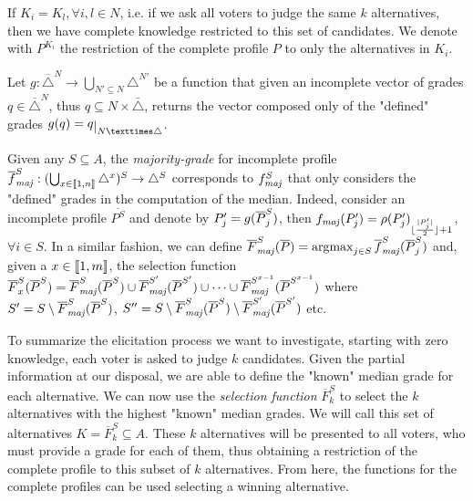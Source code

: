 If $K_i=K_l, \forall i,l\in N$, i.e. if we ask all voters to judge the same $k$ alternatives, then we have complete knowledge restricted to this set of candidates. We denote with $P^{K_i}$ the restriction of the complete profile $P$ to only the alternatives in $K_i$.

Let $g:\overline{\triangle}^N\rightarrow \bigcup_{N' \subseteq N}\triangle^{N'}$ be a function that given an incomplete vector of grades $q \in \overline{\triangle}^N$, thus $q \subseteq N × \bar{\triangle}$, returns the vector composed only of the "defined" grades $g(q) = \restr{q}{N × \triangle}$.


Given any $S \subseteq A$, the \emph{majority-grade} for incomplete profile $\fmajbar[S]: (\bigcup_{x \in \intvl{1,n}}\triangle^{x})^S \rightarrow \triangle^S$ corresponds to $\fmaj[S]$ that only considers the "defined" grades in the computation of the median. Indeed, consider an incomplete profile $\overline{P^S}$ and denote by $P'_j=g(\overline{P}^S_j)$, then $\fmaj(P'_j) = \rho(P'_j)_{\floor{\frac{\card{P'_j}}{2}} + 1}$, $\forall i \in S$.
In a similar fashion, we can define $\Fmajbar[S](\Pbar)=\argmax_{j\in S}\fmajbar[S](\Pbar^S_j)$ and, given a $x\in \llbracket1,m\rrbracket$, the selection function $\overline{F}^S_x(\Pbar^S) = \Fmajbar[S](\Pbar^S) \cup \Fmajbar[S'](\Pbar^{S'}) \cup \dots \cup \Fmajbar[S^{x-1}](\Pbar^{S^{x-1}})$ where $S'= S \setminus \Fmajbar[S](\Pbar^{S})$, $S''= S \setminus \Fmajbar[S](\Pbar^S) \setminus \Fmajbar[S'](\Pbar^{S'})$ etc.

To summarize the elicitation process we want to investigate, starting with zero knowledge, each voter is asked to judge $k$ candidates. Given the partial information at our disposal, we are able to define the "known" median grade for each alternative. We can now use the \emph{selection function} $\overline{F}^S_k$ to select the $k$ alternatives with the highest "known" median grades. We will call this set of alternatives $K=\overline{F}^S_k\subseteq A$. These $k$ alternatives will be presented to all voters, who must provide a grade for each of them, thus obtaining a restriction of the complete profile to this subset of $k$ alternatives. From here, the functions for the complete profiles can be used selecting a winning alternative.

